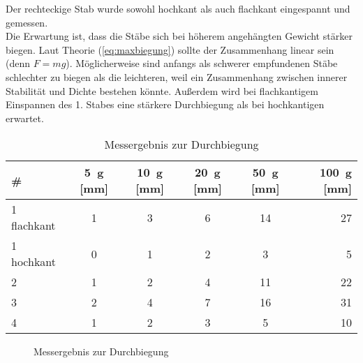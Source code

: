 Der rechteckige Stab wurde sowohl hochkant als auch flachkant eingespannt und gemessen. \\

Die Erwartung ist, dass die Stäbe sich bei höherem angehängten Gewicht stärker biegen. Laut Theorie (\cref{eq:maxbiegung}) sollte der Zusammenhang linear sein (denn $F=mg$). Möglicherweise sind anfangs als schwerer empfundenen Stäbe schlechter zu biegen als die leichteren, weil ein Zusammenhang zwischen innerer Stabilität und Dichte bestehen könnte. Außerdem wird bei flachkantigem Einspannen des 1. Stabes eine stärkere Durchbiegung als bei hochkantigen erwartet.

\begin{table}[H]
  \centering
  \begin{tabular}{l | c | c | c | c | r}
    \# & \SI{5}{g} [mm] & \SI{10}{g} [mm] & \SI{20}{g} [mm] & \SI{50}{g} [mm] & \SI{100}{g} [mm] \\ \hline
    1 flachkant & 1 & 3 & 6 & 14 & 27 \\
    1 hochkant & 0 & 1 & 2 & 3 & 5 \\
    2 & 1 & 2 & 4 & 11 & 22 \\
    3 & 2 & 4 & 7 & 16 & 31 \\
    4 & 1 & 2 & 3 & 5 & 10
  \end{tabular}
  \caption{Messergebnis zur Durchbiegung}
  \label{tab:durchbiegung}
\end{table}
\begin{figure}[H]
  \centering
  \caption{Messergebnis zur Durchbiegung}
  \label{fig:durchbiegung}
\end{figure}

